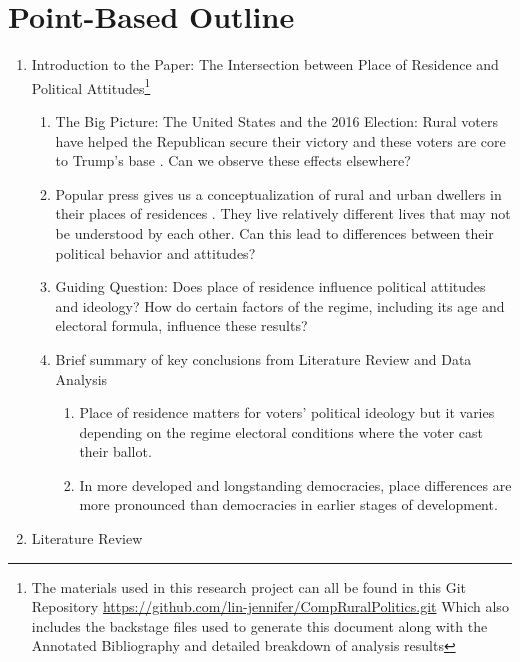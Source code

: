 \documentclass[12pt]{article}
\title{\tb{Place of Residence and Political Attitudes in Democracies Worldwide \\ {\large Point-Based Outline} }}
\author{Jennifer Lin}
\affil{Transitions to Democracy}
\begin{document}
\maketitle 

\section{Point-Based Outline}

\begin{enumerate}
\item Introduction to the Paper: The Intersection between Place of Residence and Political Attitudes\footnote{The materials used in this research project can all be found in this Git Repository \url{https://github.com/lin-jennifer/CompRuralPolitics.git} Which also includes the backstage files used to generate this document along with the Annotated Bibliography and detailed breakdown of analysis results}
\begin{enumerate}
	\item The Big Picture: The United States and the 2016 Election: Rural voters have helped the Republican secure their victory and these voters are core to Trump's base \citep{walsh_putting_2012}. Can we observe these effects elsewhere?
	\item Popular press gives us a conceptualization of rural and urban dwellers in their places of residences \citep{holloway_burning_2007}. They live relatively different lives that may not be understood by each other. Can this lead to differences between their political behavior and attitudes?
	\item Guiding Question: Does place of residence influence political attitudes and ideology? How do certain factors of the regime, including its age and electoral formula, influence these results?
	\item Brief summary of key conclusions from Literature Review and Data Analysis
	\begin{enumerate}
		\item Place of residence matters for voters' political ideology but it varies depending on the regime electoral conditions where the voter cast their ballot.
		\item In more developed and longstanding democracies, place differences are more pronounced than democracies in earlier stages of development.
	\end{enumerate}
\end{enumerate}
\item Literature Review
\begin{enumerate}

\end{enumerate}
\end{enumerate}
\end{document}
